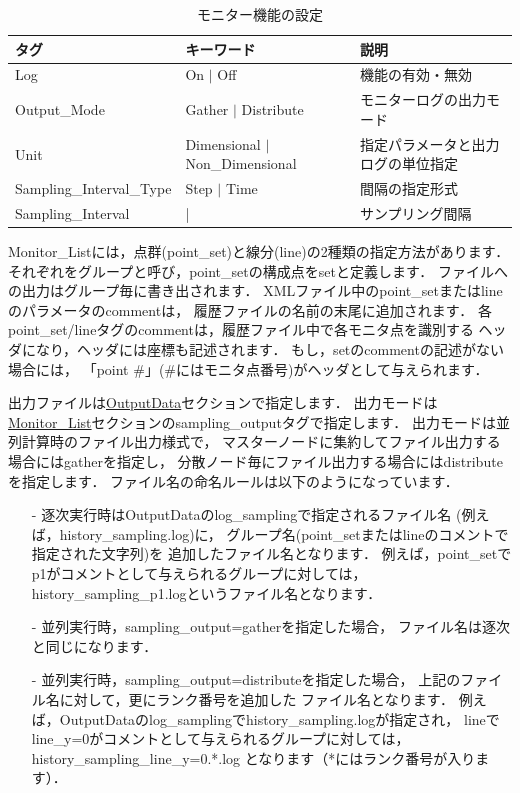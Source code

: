 \begin{table}[htdp]
\caption{モニター機能の設定}
\begin{center}
\small
\begin{tabular}{lll}\toprule
タグ & キーワード & 説明\\\midrule
Log & On $|$ Off & 機能の有効・無効\\
Output\_Mode & Gather $|$ Distribute & モニターログの出力モード\\
Unit & Dimensional $|$ Non\_Dimensional & 指定パラメータと出力ログの単位指定\\
Sampling\_Interval\_Type & Step $|$ Time & 間隔の指定形式\\
Sampling\_Interval & | & サンプリング間隔\\
\bottomrule
\end{tabular}
\end{center}
\label{tbl:outline of monitor}
\end{table}


Monitor\_Listには，点群(point\_set)と線分(line)の2種類の指定方法があります．
それぞれをグループと呼び，point\_setの構成点をsetと定義します．
ファイルへの出力はグループ毎に書き出されます．
XMLファイル中のpoint\_setまたはlineのパラメータのcommentは，
履歴ファイルの名前の末尾に追加されます．
各point\_set/lineタグのcommentは，履歴ファイル中で各モニタ点を識別する
ヘッダになり，ヘッダには座標も記述されます．
もし，setのcommentの記述がない場合には，
「point \#」(\#にはモニタ点番号)がヘッダとして与えられます． 

出力ファイルは\hyperlink{tgt:output_data}{OutputData}セクションで指定します．
出力モードは\hyperlink{tgt:monitor_list}{Monitor\_List}セクションのsampling\_outputタグで指定します．
出力モードは並列計算時のファイル出力様式で，
マスターノードに集約してファイル出力する場合にはgatherを指定し，
分散ノード毎にファイル出力する場合にはdistributeを指定します．
ファイル名の命名ルールは以下のようになっています．
\begin{itemize}
\item[-] 逐次実行時はOutputDataのlog\_samplingで指定されるファイル名
(例えば，history\_sampling.log)に，
グループ名(point\_setまたはlineのコメントで指定された文字列)を
追加したファイル名となります．
例えば，point\_setでp1がコメントとして与えられるグループに対しては，
history\_sampling\_p1.logというファイル名となります．
\item[-] 並列実行時，sampling\_output=gatherを指定した場合，
ファイル名は逐次と同じになります．
\item[-] 並列実行時，sampling\_output=distributeを指定した場合，
上記のファイル名に対して，更にランク番号を追加した ファイル名となります．
例えば，OutputDataのlog\_samplingでhistory\_sampling.logが指定され，
lineでline\_y=0がコメントとして与えられるグループに対しては，
history\_sampling\_line\_y=0.*.log となります（*にはランク番号が入ります）． 
\end{itemize}

